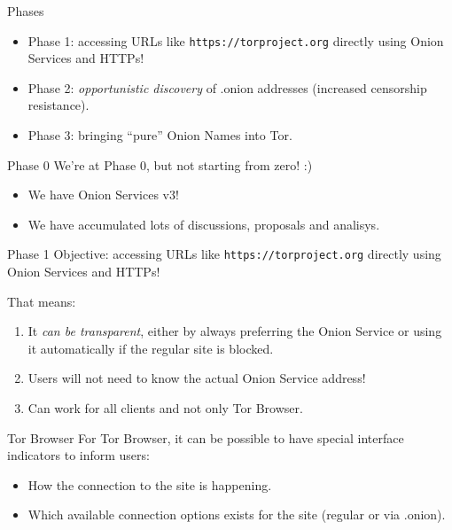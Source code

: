 \documentclass[
  ignorenonframetext,
]{beamer}
\providecommand{\tightlist}{%
  \setlength{\itemsep}{0pt}\setlength{\parskip}{0pt}}
\begin{document}
\begin{frame}[fragile]{Phases}
\protect\hypertarget{phases}{}
\begin{itemize}
\tightlist
\item
  Phase 1: accessing URLs like \texttt{https://torproject.org} directly
  using Onion Services and HTTPs!
\item
  Phase 2: \emph{opportunistic discovery} of .onion addresses (increased
  censorship resistance).
\item
  Phase 3: bringing ``pure'' Onion Names into Tor.
\end{itemize}
\end{frame}

\begin{frame}{Phase 0}
\protect\hypertarget{phase-0}{}
We're at Phase 0, but not starting from zero! :)

\begin{itemize}
\tightlist
\item
  We have Onion Services v3!
\item
  We have accumulated lots of discussions, proposals and analisys.
\end{itemize}
\end{frame}

\begin{frame}[fragile]{Phase 1}
\protect\hypertarget{phase-1}{}
Objective: accessing URLs like \texttt{https://torproject.org} directly
using Onion Services and HTTPs!

That means:

\begin{enumerate}
\item
  It \emph{can be transparent}, either by always preferring the Onion
  Service or using it automatically if the regular site is blocked.
\item
  Users will not need to know the actual Onion Service address!
\item
  Can work for all clients and not only Tor Browser.
\end{enumerate}
\end{frame}

\begin{frame}{Tor Browser}
\protect\hypertarget{tor-browser}{}
For Tor Browser, it can be possible to have special interface indicators
to inform users:

\begin{itemize}
\tightlist
\item
  How the connection to the site is happening.
\item
  Which available connection options exists for the site (regular or via
  .onion).
\end{itemize}
\end{frame}
\end{document}
